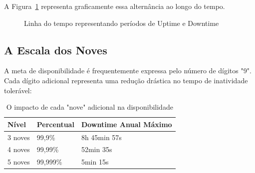 \documentclass[12pt,a4paper,twoside]{report}
\begin{document}
A Figura~\ref{fig:uptime-downtime} representa graficamente essa alternância ao longo do tempo.

\begin{figure}[h]
    \centering
    \caption{Linha do tempo representando períodos de Uptime e Downtime}
    \label{fig:uptime-downtime}
\end{figure}

\subsection{A Escala dos Noves}

A meta de disponibilidade é frequentemente expressa pelo número de dígitos "9". Cada dígito adicional representa uma redução drástica no tempo de inatividade tolerável:

\begin{table}[h]
\centering
\begin{tabular}{@{}lll@{}}
\toprule
\textbf{Nível} & \textbf{Percentual} & \textbf{Downtime Anual Máximo} \\ \midrule
3 noves        & 99,9\%              & 8h 45min 57s                   \\
4 noves        & 99,99\%             & 52min 35s                      \\
5 noves        & 99,999\%            & 5min 15s                       \\ \bottomrule
\end{tabular}
\caption{O impacto de cada "nove" adicional na disponibilidade}
\end{table}
\end{document}
